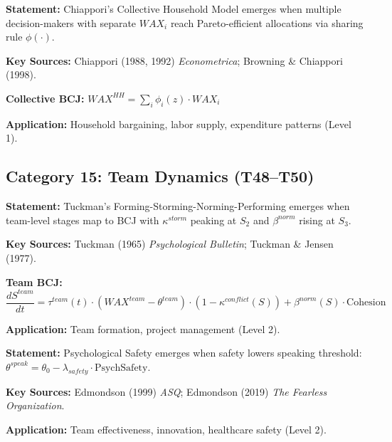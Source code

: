 \begin{tcolorbox}[colback=brown!5!white, colframe=brown!75!black,
    title=Theorem BCJ-T47: Chiappori Collective Household as Special Case]
\textbf{Statement:} Chiappori's Collective Household Model emerges when multiple decision-makers with separate $WAX_i$ reach Pareto-efficient allocations via sharing rule $\phi(\cdot)$.

\textbf{Key Sources:} Chiappori (1988, 1992) \textit{Econometrica}; Browning \& Chiappori (1998).

\textbf{Collective BCJ:} $WAX^{HH} = \sum_{i} \phi_i(z) \cdot WAX_i$

\textbf{Application:} Household bargaining, labor supply, expenditure patterns (Level 1).
\end{tcolorbox}

\subsection{Category 15: Team Dynamics (T48--T50)}

\begin{tcolorbox}[colback=olive!5!white, colframe=olive!75!black,
    title=Theorem BCJ-T48: Tuckman Team Stages as Special Case]
\textbf{Statement:} Tuckman's Forming-Storming-Norming-Performing emerges when team-level stages map to BCJ with $\kappa^{storm}$ peaking at $S_2$ and $\beta^{norm}$ rising at $S_3$.

\textbf{Key Sources:} Tuckman (1965) \textit{Psychological Bulletin}; Tuckman \& Jensen (1977).

\textbf{Team BCJ:}
\begin{equation}
\frac{dS^{team}}{dt} = \tau^{team}(t) \cdot (WAX^{team} - \theta^{team}) \cdot (1-\kappa^{conflict}(S)) + \beta^{norm}(S) \cdot \text{Cohesion}
\end{equation}

\textbf{Application:} Team formation, project management (Level 2).
\end{tcolorbox}

\begin{tcolorbox}[colback=olive!5!white, colframe=olive!75!black,
    title=Theorem BCJ-T49: Edmondson Psychological Safety as Special Case]
\textbf{Statement:} Psychological Safety emerges when safety lowers speaking threshold: $\theta^{speak} = \theta_0 - \lambda_{safety} \cdot \text{PsychSafety}$.

\textbf{Key Sources:} Edmondson (1999) \textit{ASQ}; Edmondson (2019) \textit{The Fearless Organization}.

\textbf{Application:} Team effectiveness, innovation, healthcare safety (Level 2).
\end{tcolorbox}

